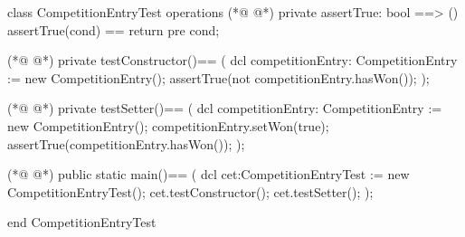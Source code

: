 \begin{vdmpp}[breaklines=true]
class CompetitionEntryTest
 operations
(*@
\label{assertTrue:3}
@*)
  private assertTrue: bool ==> ()
    assertTrue(cond) == return
    pre cond;
    
(*@
\label{testConstructor:7}
@*)
  private testConstructor()==
  (
   dcl competitionEntry: CompetitionEntry := new CompetitionEntry();
   assertTrue(not competitionEntry.hasWon());
  );
  
(*@
\label{testSetter:13}
@*)
  private testSetter()==
  (
   dcl competitionEntry: CompetitionEntry := new CompetitionEntry();
   competitionEntry.setWon(true);
   assertTrue(competitionEntry.hasWon());
  );
  
(*@
\label{main:20}
@*)
  public static main()==
    (
   dcl cet:CompetitionEntryTest := new CompetitionEntryTest();
   cet.testConstructor();
   cet.testSetter();
    );
     
end CompetitionEntryTest
\end{vdmpp}
